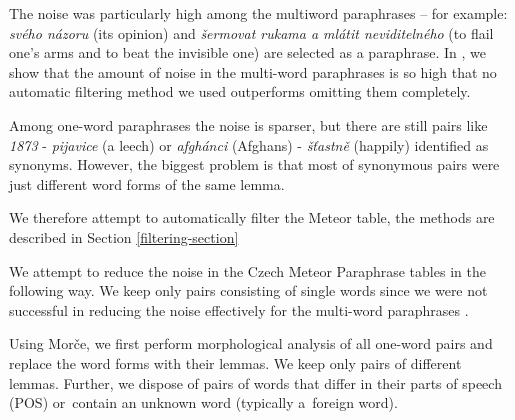 \documentclass[11pt]{article}
\begin{document}
The noise was particularly high among the multiword paraphrases -- for example: \textit{svého názoru} 
(its opinion) and \textit{šermovat rukama a mlátit neviditelného} (to flail one's arms and to beat 
the invisible one) are selected as a paraphrase. In , we show that the amount 
of noise in the multi-word paraphrases is so high that no automatic filtering method we used outperforms 
omitting them completely.

Among one-word paraphrases the noise is sparser, but there are still pairs like \textit{1873} - 
\textit{pijavice} (a leech) or \textit{afgh\'{a}nci} (Afghans) - \textit{š\v{t}astně} (happily) 
identified as synonyms. However, the biggest problem is that most of synonymous pairs were just 
different word forms of the same lemma. 

We therefore attempt to automatically filter the Meteor table, the methods are described in Section 
\ref{filtering-section}





We attempt to reduce the noise in the Czech Meteor Paraphrase tables in the following way. We 
keep only pairs consisting of single words since we were not successful in reducing the noise
effectively for the multi-word paraphrases \cite{barancikova2014}. 

Using Morče, we first perform morphological analysis of all one-word pairs and replace 
the word forms with their lemmas.  We keep only pairs of different lemmas. Further, we
 dispose of pairs of words that differ in their parts of speech (POS) or~contain an 
unknown word (typically a~foreign word). 
\end{document}

